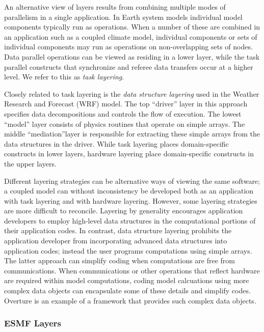 An alternative view of layers results from combining multiple modes of parallelism 
in a single application.  In Earth system models individual model 
components typically run as  
operations.  When a number of 
these are combined in an application such as a coupled climate model, individual 
components or sets of individual components may run as  operations 
on non-overlapping sets of nodes.  Data parallel operations can be viewed
as residing in a lower layer, while the task parallel constructs that 
synchronize and referee data transfers occur at a higher level. We refer to 
this as {\it task layering}.

Closely related to task layering is the {\it data structure layering} used 
in the Weather Research and Forecast (WRF) model.  The top ``driver'' layer 
in this approach specifies data decompositions and controls
the flow of execution.  The lowest ``model'' layer consists of physics routines that
operate on simple arrays.  The middle ``mediation''layer is responsible for 
extracting these simple arrays from the data structures in the driver.
While task layering places domain-specific constructs in lower layers, hardware 
layering place domain-specific constructs in the upper layers.  

Different layering strategies can be alternative ways of viewing the same
software; a coupled model can without inconsistency 
be developed both as an application with task layering and with hardware 
layering.  However, some layering strategies are more difficult to reconcile. 
Layering by generality encourages application developers to employ high-level 
data structures in the computational portions of their application codes.  In 
contrast, data structure layering prohibits the application developer from 
incorporating advanced data structures into application codes; instead the
user programs computations using simple arrays.  The latter approach can 
simplify coding
when computations are free from communications.  When communications or other
operations that reflect hardware are required within model computations, coding
model calcuations using more complex data objects can encapsulate some of 
these details and simplify codes.  Overture is an example of a framework 
that provides such complex data objects.

\subsubsection{ESMF Layers}

